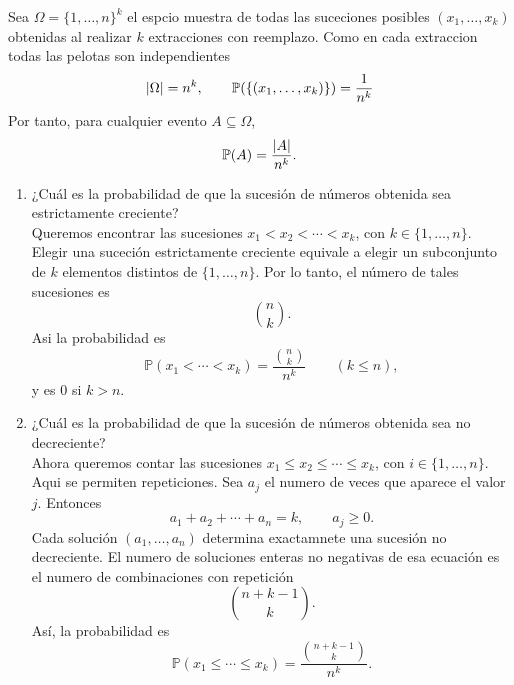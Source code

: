 \message{ !name(tarea2.tex)}\documentclass[12pt,a4paper]{article}
\begin{document}
    \begin{solucion}
        Sea $\Omega=\{1,\dots,n\}^{k}$ el espcio muestra de todas las suceciones posibles
        $(x_{1},\dots,x_{k})$ obtenidas al realizar $k$ extracciones con reemplazo.
        Como en cada extraccion todas las pelotas son independientes
        \begin{align*}
            \abs{\Omega}=n^{k},\qquad \mathbb{P}(\{(x_{1},\dots,x_{k})\})=\frac{1}{n^{k}}
        \end{align*}
        Por tanto, para cualquier evento $A\subseteq\Omega$,
        \begin{equation*}
            \mathbb{P}(A)=\frac{\abs{A}}{n^{k}}.
        \end{equation*}
        \begin{enumerate}
            \item[(a)] ¿Cuál es la probabilidad de que la sucesión de números obtenida sea estrictamente creciente?\\
            Queremos encontrar las sucesiones $x_{1}\lt x_{2}\lt\cdots\lt x_{k}$, con $k\in\{1,\dots,n\}$.
            Elegir una suceción estrictamente creciente equivale a elegir un subconjunto de $k$ elementos
            distintos de $\{1,\dots,n\}$. Por lo tanto, el número de tales sucesiones es
            \begin{equation*}
                \binom{n}{k}.
            \end{equation*}
            Asi la probabilidad es
            \begin{equation*}
                \mathbb{P}(x_{1}\lt\cdots\lt x_{k})=\frac{\binom{n}{k}}{n^{k}} \qquad (k\leq n),
            \end{equation*}
            y es 0 si $k\gt n$.
            \item[(b)] ¿Cuál es la probabilidad de que la sucesión de números obtenida sea no decreciente?\\
            Ahora queremos contar las sucesiones $x_{1}\leq x_{2}\leq\cdots\leq x_{k}$, con $i\in\{1,\dots,n\}$.
            Aqui se permiten repeticiones.
            Sea $a_{j}$ el numero de veces que aparece el valor $j$. Entonces
            \begin{equation*}
                a_{1}+a_{2}+\cdots+a_{n}=k,\qquad a_{j}\geq0.
            \end{equation*}
            Cada solución $(a_{1},\dots,a_{n})$ determina exactamnete una sucesión no decreciente.
            El numero de soluciones enteras no negativas de esa ecuación es el numero de combinaciones con
            repetición
            \begin{equation*}
                \binom{n+k-1}{k}.
            \end{equation*}
            Así, la probabilidad es
            \begin{equation*}
                \mathbb{P}(x_{1}\leq\cdots\leq x_{k})=\frac{\binom{n+k-1}{k}}{n^{k}}.
            \end{equation*}
        \end{enumerate}
    \end{solucion}
    
\end{document}
